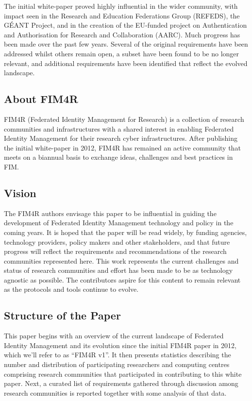 \documentclass[fleqn,10pt]{wlscirep}
\begin{document}
{The initial white-paper proved highly influential in the wider community, with impact seen in the Research and Education Federations Group (REFEDS)\cite{refeds}, the GÉANT Project\cite{GN4}, and in the creation of the EU-funded project on Authentication and Authorisation for Research and Collaboration (AARC)\cite{aarc}. Much progress has been made over the past few years. Several of the original requirements have been addressed whilst others remain open, a subset have been found to be no longer relevant, and additional requirements have been identified that reflect the evolved landscape. 

\subsection{About FIM4R}
FIM4R\cite{fim4rweb} (Federated Identity Management for Research) is a collection of research communities and infrastructures with a shared interest in enabling Federated Identity Management for their research cyber infrastructures. After publishing the initial white-paper in 2012, FIM4R has remained an active community that meets on a biannual basis to exchange ideas, challenges and best practices in FIM.  

\subsection{Vision}
The FIM4R authors envisage this paper to be influential in guiding the development of Federated Identity Management technology and policy in the coming years. It is hoped that the paper will be read widely, by funding agencies, technology providers, policy makers and other stakeholders, and that future progress will reflect the requirements and recommendations of the research communities represented here. This work represents the current challenges and status of research communities and effort has been made to be as technology agnostic as possible. The contributors aspire for this content to remain relevant as the protocols and tools continue to evolve. 

\subsection{Structure of the Paper}
This paper begins with an overview of the current landscape of Federated Identity Management and its evolution since the initial FIM4R paper\cite{FIM4Rv1:2012} in 2012, which we’ll refer to as “FIM4R v1”. It then presents statistics describing the number and distribution of participating researchers and computing centres comprising research communities that participated in contributing to this white paper. Next, a curated list of requirements gathered through discussion among research communities is reported together with some analysis of that data. 

}
\end{document}

